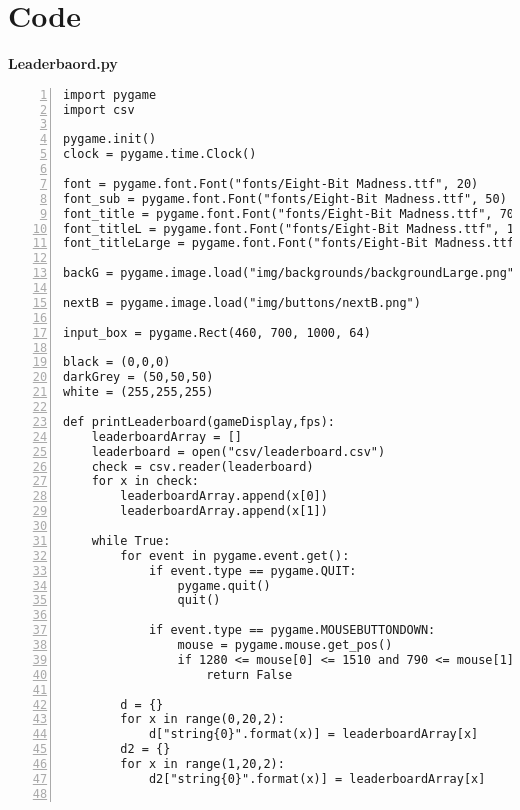 \documentclass[12pt]{report}
\begin{document}
\normalsize











\label{mylastpage}

\appendix

\chapter{Code}
\label{appendix}
\setcounter{page}{13}

\textbf{Leaderbaord.py}
\tiny
\begin{Verbatim}[numbers=left, frame=single]
import pygame
import csv

pygame.init()                                                                               
clock = pygame.time.Clock()

font = pygame.font.Font("fonts/Eight-Bit Madness.ttf", 20)
font_sub = pygame.font.Font("fonts/Eight-Bit Madness.ttf", 50)
font_title = pygame.font.Font("fonts/Eight-Bit Madness.ttf", 70)
font_titleL = pygame.font.Font("fonts/Eight-Bit Madness.ttf", 100)
font_titleLarge = pygame.font.Font("fonts/Eight-Bit Madness.ttf", 150)

backG = pygame.image.load("img/backgrounds/backgroundLarge.png")

nextB = pygame.image.load("img/buttons/nextB.png")

input_box = pygame.Rect(460, 700, 1000, 64)                                                  

black = (0,0,0)
darkGrey = (50,50,50)
white = (255,255,255)

def printLeaderboard(gameDisplay,fps):
    leaderboardArray = []
    leaderboard = open("csv/leaderboard.csv")
    check = csv.reader(leaderboard)
    for x in check:
        leaderboardArray.append(x[0])
        leaderboardArray.append(x[1])

    while True:
        for event in pygame.event.get():
            if event.type == pygame.QUIT:
                pygame.quit()
                quit()

            if event.type == pygame.MOUSEBUTTONDOWN:
                mouse = pygame.mouse.get_pos()
                if 1280 <= mouse[0] <= 1510 and 790 <= mouse[1] <= 870:
                    return False
                
        d = {}
        for x in range(0,20,2):
            d["string{0}".format(x)] = leaderboardArray[x]
        d2 = {}
        for x in range(1,20,2):
            d2["string{0}".format(x)] = leaderboardArray[x]
                        

\end{Verbatim}
\end{document}
